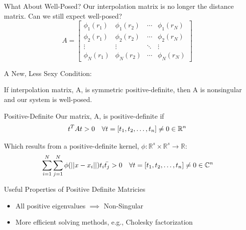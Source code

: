 \documentclass[12pt,t]{beamer}
\newcommand{\bi}{\begin{itemize}}
\newcommand{\ei}{\end{itemize}}
\newcommand{\subt}[1]{{\footnotesize \color{subtitle} {#1}}}
\begin{document}
\begin{frame}{What About Well-Posed?}
Our interpolation matrix is no longer the distance matrix. Can we still expect well-posed?
\begin{equation*}
A=
\begin{bmatrix}
\phi_1(r_1) & \phi_1(r_2) & \cdots & \phi_1(r_N)\\
\phi_2(r_1) & \phi_2(r_2)& \cdots & \phi_2(r_N)\\
\vdots & \vdots & \ddots & \vdots\\
\phi_N(r_1) & \phi_N(r_2)& \cdots & \phi_N(r_N)
\end{bmatrix}
\end{equation*}
\pause

\subt{A New, Less Sexy Condition:}

If interpolation matrix, A, is symmetric \subt{positive-definite}, then A is nonsingular and our system is well-posed.

\note{}
\end{frame}

\begin{frame}{Positive-Definite}
Our matrix, A, is \subt{positive-definite} if
\begin{align*}
& t^TAt>0 & \forall t=\left[ t_1, t_2, \mathellipsis, t_n\right]\neq 0 \in \mathbb{R}^n
\end{align*}

Which results from a \subt{positive-definite} kernel, $\phi: \mathbb{R}^s \times \mathbb{R}^s \rightarrow \mathbb{R}$:
\begin{align*}
&\sum_{i=1}^N \sum_{j=1}^N \phi(||x-x_i||)t_i\bar{t_j}>0 &\forall t=\left[ t_1, t_2, \mathellipsis, t_n\right]\neq 0 \in \mathbb{C}^n
\end{align*}

\subt{Useful Properties of Positive Definite Matricies}
\bi
\item All positive eigenvalues $\implies$ Non-Singular
\item More efficient solving methods, e.g., Cholesky factorization
\ei

\note{}
\end{frame}
\end{document}
